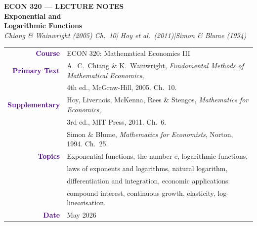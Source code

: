 \documentclass[12pt, a4paper]{article}
\theoremstyle{definition}
\newcommand{\e}{\mathrm{e}}
\begin{document}

\thispagestyle{empty}

\vspace*{-1.7cm}
\begin{center}
  {\color{white}\large\bfseries\sffamily ECON 320 --- LECTURE NOTES}\\[10pt]
  {\color{white}\Huge\bfseries Exponential and}\\[6pt]
  {\color{white}\Huge\bfseries Logarithmic Functions}\\[10pt]
  {\color{amber}\large\itshape
   Chiang \& Wainwright (2005) Ch.\ 10\quad|\quad
   Hoy et al.\ (2011)\quad|\quad Simon \& Blume (1994)}
\end{center}

\vspace{3.8cm}
\begin{center}
\begin{tabular}{r l}
  \textbf{\textcolor{indigo}{Course}}
    & ECON 320: Mathematical Economics III \\[3pt]
  \textbf{\textcolor{indigo}{Primary Text}}
    & A.\ C.\ Chiang \& K.\ Wainwright,
      \textit{Fundamental Methods of Mathematical Economics},\\
    & 4th ed., McGraw-Hill, 2005. Ch.\ 10. \\[3pt]
  \textbf{\textcolor{indigo}{Supplementary}}
    & Hoy, Livernois, McKenna, Rees \& Stengos,
      \textit{Mathematics for Economics},\\
    & 3rd ed., MIT Press, 2011. Ch.\ 6. \\[2pt]
    & Simon \& Blume,
      \textit{Mathematics for Economists}, Norton, 1994. Ch.\ 25. \\[3pt]
  \textbf{\textcolor{indigo}{Topics}}
    & Exponential functions, the number $\e$, logarithmic functions,\\
    & laws of exponents and logarithms, natural logarithm,\\
    & differentiation and integration, economic applications:\\
    & compound interest, continuous growth, elasticity, log-linearisation. \\[3pt]
  \textbf{\textcolor{indigo}{Date}} & May 2026 \\
\end{tabular}
\end{center}
\end{document}
